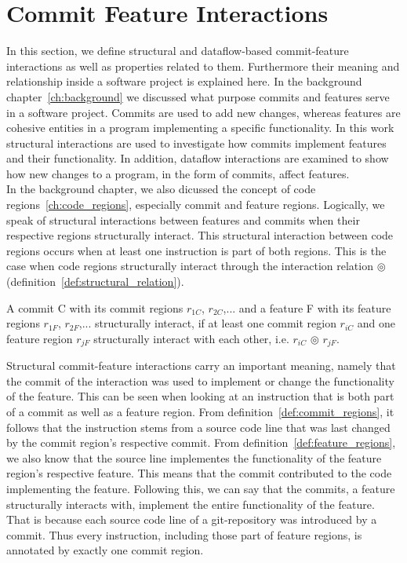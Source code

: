 \section*{Commit Feature Interactions}\label{ch:example_chapter}

In this section, we define structural and dataflow-based commit-feature interactions as well as properties related to them.
Furthermore their meaning and relationship inside a software project is explained here. 
In the background chapter~\ref{ch:background} we discussed what purpose commits and features serve in a software project.
Commits are used to add new changes, whereas features are cohesive entities in a program implementing a specific functionality.
In this work structural interactions are used to investigate how commits implement features and their functionality.
In addition, dataflow interactions are examined to show how new changes to a program, in the form of commits, affect features. \\
In the background chapter, we also dicussed the concept of code regions~\ref{ch:code_regions}, especially commit and feature regions. 
Logically, we speak of structural interactions between features and commits when their respective regions structurally interact. 
This structural interaction between code regions occurs when at least one instruction is part of both regions.
This is the case when code regions structurally interact through the interaction relation $\circledcirc$ (definition~\ref{def:structural_relation}).

\begin{definition}\label{def:structural_cfi}
A commit C with its commit regions $r_{1C}$, $r_{2C}$,... and a feature F with its feature regions $r_{1F}$, $r_{2F}$,... structurally interact, if at least one commit region $r_{iC}$ and one feature region $r_{jF}$ structurally interact with each other, i.e. $r_{iC}$ $\circledcirc$ $r_{jF}$.
\end{definition}

Structural commit-feature interactions carry an important meaning, namely that the commit of the interaction was used to implement or change the functionality of the feature.
This can be seen when looking at an instruction that is both part of a commit as well as a feature region.
From definition~\ref{def:commit_regions}, it follows that the instruction stems from a source code line that was last changed by the commit region's respective commit. 
From definition~\ref{def:feature_regions}, we also know that the source line implementes the functionality of the feature region's respective feature. 
This means that the commit contributed to the code implementing the feature.
Following this, we can say that the commits, a feature structurally interacts with, implement the entire functionality of the feature.
That is because each source code line of a git-repository was introduced by a commit.
Thus every instruction, including those part of feature regions, is annotated by exactly one commit region. 

